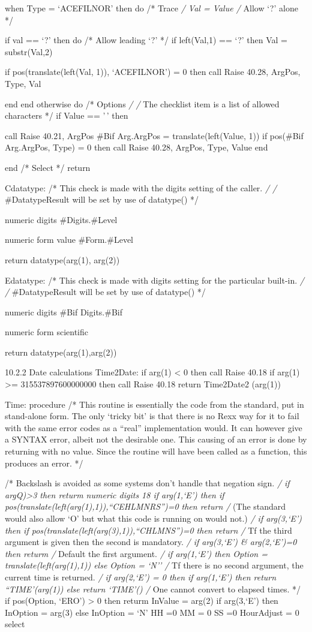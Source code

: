 when Type = `ACEFILNOR' then do /* Trace \emph{/ Val = Value /} Allow
`?' alone */

if val == `?' then do /* Allow leading `?' */ if left(Val,1) == `?' then
Val = substr(Val,2)

if pos(translate(left(Val, 1)), `ACEFILNOR') = 0 then call Raise 40.28,
ArgPos, Type, Val

end end otherwise do /* Options \emph{/ /} The checklist item is a list
of allowed characters */ if Value == '\,' then

call Raise 40.21, ArgPos \#Bif Arg.ArgPos = translate(left(Value, 1)) if
pos(\#Bif Arg.ArgPos, Type) = 0 then call Raise 40.28, ArgPos, Type,
Value end

end /* Select */ return

Cdatatype: /* This check is made with the digits setting of the caller.
\emph{/ /} \#DatatypeResult will be set by use of datatype() */

numeric digits \#Digits.\#Level

numeric form value \#Form.\#Level

return datatype(arg(1), arg(2))

Edatatype: /* This check is made with digits setting for the particular
built-in. \emph{/ /} \#DatatypeResult will be set by use of datatype()
*/

numeric digits \#Bif Digits.\#Bif

numeric form scientific

return datatype(arg(1),arg(2))

10.2.2 Date calculations Time2Date: if arg(1) \textless{} 0 then call
Raise 40.18 if arg(1) \textgreater= 315537897600000000 then call Raise
40.18 return Time2Date2 (arg(1))

Time: procedure /* This routine is essentially the code from the
standard, put in stand-alone form. The only `tricky bit' is that there
is no Rexx way for it to fail with the same error codes as a ``real''
implementation would. It can however give a SYNTAX error, albeit not the
desirable one. This causing of an error is done by returning with no
value. Since the routine will have been called as a function, this
produces an error. */

/* Backslash is avoided as some systems don't handle that negation sign.
\emph{/ if argQ)\textgreater3 then returm numeric digits 18 if
arg(1,`E') then if pos(translate(left(arg(1),1)),``CEHLMNRS'')=0 then
return /} (The standard would also allow `O' but what this code is
running on would not.) \emph{/ if arg(3,`E') then if
pos(translate(left(arg(3),1)),``CHLMNS'')=0 then return /} Tf the third
argument is given then the second is mandatory. \emph{/ if arg(3,`E') \&
arg(2,`E')=0 then returm /} Default the first argument. \emph{/ if
arg(1,`E') then Option = translate(left(arg(1),1)) else Option = `N'' /}
Tf there is no second argument, the current time is returned. \emph{/ if
arg(2,`E') = 0 then if arg(1,`E') then return ``TIME'(arg(1)) else
return `TIME'() /} One cannot convert to elapsed times. */ if
pos(Option, `ERO') \textgreater{} 0 then returm InValue = arg(2) if
arg(3,`E') then InOption = arg(3) else InOption = `N' HH =0 MM = 0 SS =0
HourAdjust = 0 select

